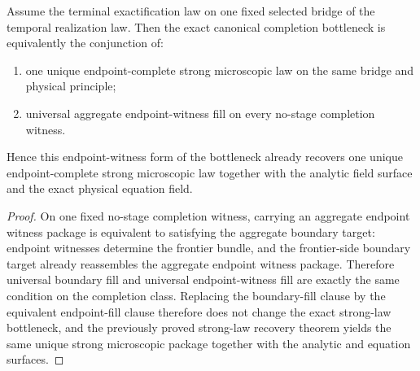 \begin{theorem}
\label{thm:canonical-completion-bottleneck-iff-canonical-strong-microscopic-law-plus-universal-endpoint-fill}
Assume the terminal exactification law on one fixed selected bridge of the
temporal realization law. Then the exact canonical completion bottleneck is
equivalently the conjunction of:
\begin{enumerate}
\item one unique endpoint-complete strong microscopic law on the same bridge
and physical principle;
\item universal aggregate endpoint-witness fill on every no-stage
      completion witness.
\end{enumerate}
Hence this endpoint-witness form of the bottleneck already recovers one unique
endpoint-complete strong microscopic law together with the analytic field
surface and the exact physical equation field.
\end{theorem}

\begin{proof}
On one fixed no-stage completion witness, carrying an aggregate endpoint
witness package is equivalent to satisfying the aggregate boundary target:
endpoint witnesses determine the frontier bundle, and the frontier-side
boundary target already reassembles the aggregate endpoint witness package.
Therefore universal boundary fill and universal endpoint-witness fill are
exactly the same condition on the completion class. Replacing the boundary-fill clause by
the equivalent endpoint-fill clause therefore does not change the exact
strong-law bottleneck, and the previously proved strong-law recovery theorem
yields the same unique strong microscopic package together with the analytic
and equation surfaces.
\end{proof}

